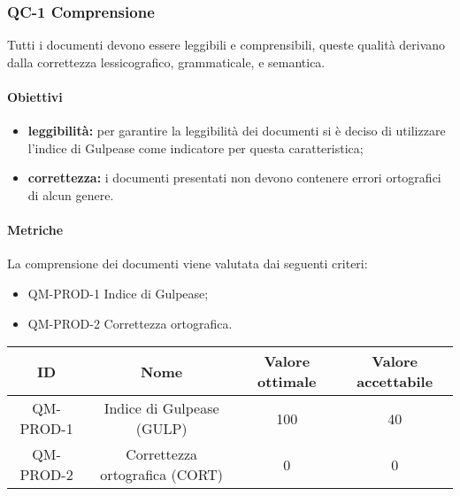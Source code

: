 \subsubsection{QC-1 Comprensione}
Tutti i documenti devono essere leggibili e comprensibili, queste qualità derivano dalla correttezza lessicografico, grammaticale, e semantica.
	\paragraph{Obiettivi}
		\begin{itemize}
			\item \textbf{leggibilità:} per garantire la leggibilità dei documenti si è deciso di utilizzare l'indice di Gulpease come indicatore per questa caratteristica;
			\item \textbf{correttezza:} i documenti presentati non devono contenere errori ortografici di alcun genere.
		\end{itemize}
	\paragraph{Metriche}
	La comprensione dei documenti viene valutata dai seguenti criteri:
	\begin{itemize}
		\item QM-PROD-1 Indice di Gulpease;
    \item QM-PROD-2 Correttezza ortografica.
	\end{itemize}
	\begin{center}
		\begin{tabular}{|c|c|c|c|}
			\rowcolor{lighter-grayer}
			\hline
			ID & Nome & Valore ottimale & Valore accettabile \\
			\hline
			QM-PROD-1 & Indice di Gulpease (GULP) & 100 & 40 \\
 		  	\hline
			QM-PROD-2 & Correttezza ortografica (CORT) & 0 & 0 \\
			\hline
		\end{tabular}
	\end{center}
